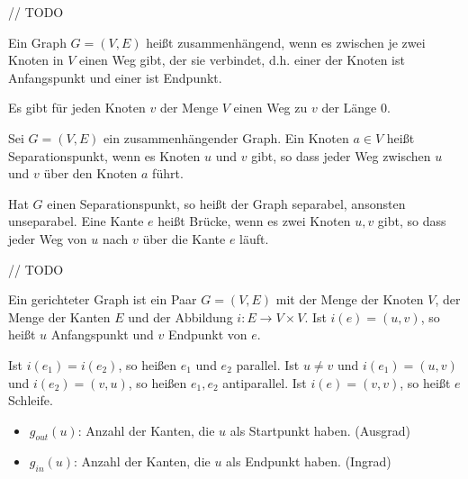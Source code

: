 \begin{beispiel}
	// TODO
\end{beispiel}


\begin{definition}
	
	Ein Graph $G = (V, E)$ heißt zusammenhängend, wenn es zwischen je zwei Knoten in $V$ einen Weg gibt, der sie verbindet, d.h. einer der Knoten ist Anfangspunkt und einer ist Endpunkt. 
	
	Es gibt für jeden Knoten $v$ der Menge $V$ einen Weg zu $v$ der Länge $0$.
\end{definition}


\begin{definition}
	
	Sei $G = (V, E)$ ein zusammenhängender Graph. Ein Knoten $a \in V$ heißt Separationspunkt, wenn es Knoten $u$ und $v$ gibt, so dass jeder Weg zwischen $u$ und $v$ über den Knoten $a$ führt.
	
	Hat $G$ einen Separationspunkt, so heißt der Graph separabel, ansonsten unseparabel. Eine Kante $e$ heißt Brücke, wenn es zwei Knoten $u, v$ gibt, so dass jeder Weg von $u$ nach $v$ über die Kante $e$ läuft.
\end{definition}


\begin{beispiel}
	// TODO
\end{beispiel}


\begin{definition}

	Ein gerichteter Graph ist ein Paar $G = (V, E)$ mit der Menge der Knoten $V$, der Menge der Kanten $E$ und der Abbildung $i: E \rightarrow V \times V$. Ist $i(e) = (u, v)$, so heißt $u$ Anfangspunkt und $v$ Endpunkt von $e$.
	
	Ist $i(e_1) = i(e_2)$, so heißen $e_1$ und $e_2$ parallel. Ist $u \ne v$ und $i(e_1) = (u, v)$ und $i(e_2) = (v, u)$, so heißen $e_1, e_2$ antiparallel. Ist $i(e) = (v, v)$, so heißt $e$ Schleife.
	
	\begin{itemize}
		\item $g_{out}(u)$: Anzahl der Kanten, die $u$ als Startpunkt haben. (Ausgrad)
		\item $g_{in}(u)$: Anzahl der Kanten, die $u$ als Endpunkt haben. (Ingrad)
	\end{itemize}
\end{definition}


